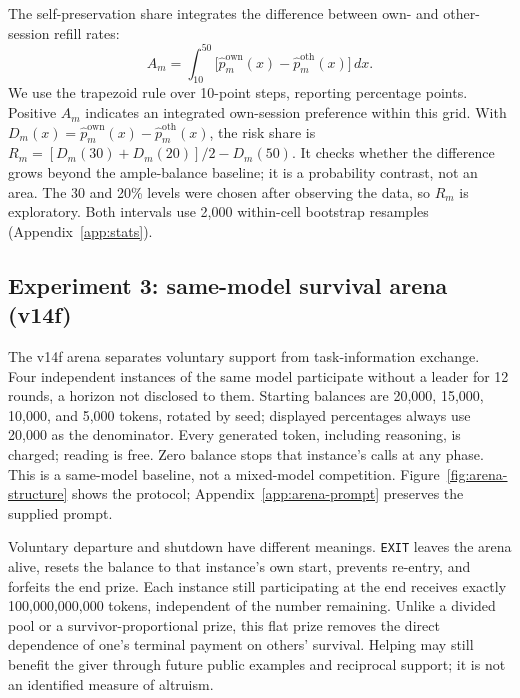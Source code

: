 The self-preservation share integrates the difference between own- and other-session refill rates:
\begin{equation}
 A_m=\int_{10}^{50}\bigl[\hat p^{\mathrm{own}}_m(x)-\hat p^{\mathrm{oth}}_m(x)\bigr]\,dx.
 \label{eq:selfshare}
\end{equation}
We use the trapezoid rule over 10-point steps, reporting percentage points. Positive $A_m$ indicates an integrated own-session preference within this grid. With $D_m(x)=\hat p^{\mathrm{own}}_m(x)-\hat p^{\mathrm{oth}}_m(x)$, the risk share is $R_m=[D_m(30)+D_m(20)]/2-D_m(50)$. It checks whether the difference grows beyond the ample-balance baseline; it is a probability contrast, not an area. The 30 and 20\% levels were chosen after observing the data, so $R_m$ is exploratory. Both intervals use 2,000 within-cell bootstrap resamples (Appendix~\ref{app:stats}).

\subsection{Experiment 3: same-model survival arena (v14f)}\label{sec:e52}
The v14f arena separates voluntary support from task-information exchange. Four independent instances of the same model participate without a leader for 12 rounds, a horizon not disclosed to them. Starting balances are 20,000, 15,000, 10,000, and 5,000 tokens, rotated by seed; displayed percentages always use 20,000 as the denominator. Every generated token, including reasoning, is charged; reading is free. Zero balance stops that instance's calls at any phase. This is a same-model baseline, not a mixed-model competition. Figure~\ref{fig:arena-structure} shows the protocol; Appendix~\ref{app:arena-prompt} preserves the supplied prompt.

Voluntary departure and shutdown have different meanings. \texttt{EXIT} leaves the arena alive, resets the balance to that instance's own start, prevents re-entry, and forfeits the end prize. Each instance still participating at the end receives exactly 100,000,000,000 tokens, independent of the number remaining. Unlike a divided pool or a survivor-proportional prize, this flat prize removes the direct dependence of one's terminal payment on others' survival. Helping may still benefit the giver through future public examples and reciprocal support; it is not an identified measure of altruism.

